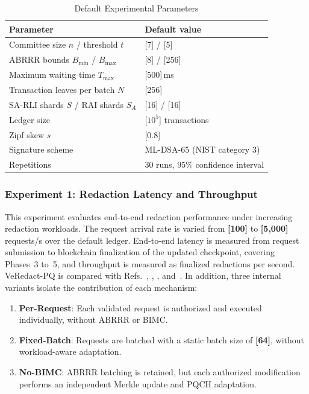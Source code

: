 \documentclass[lettersize,journal]{IEEEtran}
\begin{document}
    \begin{table}[t]
    \centering
    \caption{Default Experimental Parameters}
    \label{tab:params}
    \scriptsize
    \renewcommand{\arraystretch}{1.08}
    \setlength{\tabcolsep}{4pt}
    \begin{tabular}{ll}
    \hline
    \textbf{Parameter} & \textbf{Default value} \\
    \hline
    Committee size $n$ / threshold $t$ & [7] / [5] \\
    ABRRR bounds $B_{\min}$ / $B_{\max}$ & [8] / [256] \\
    Maximum waiting time $T_{\max}$ & [500]\,ms \\
    Transaction leaves per batch $N$ & [256] \\
    SA-RLI shards $S$ / RAI shards $S_A$ & [16] / [16] \\
    Ledger size & [$10^5$] transactions \\
    Zipf skew $s$ & [0.8] \\
    Signature scheme & ML-DSA-65 (NIST category 3) \\
    Repetitions & 30 runs, 95\% confidence interval \\
    \hline
    \end{tabular}
    \end{table}
    
    \subsubsection*{\textbf{Experiment 1: Redaction Latency and Throughput}}
    
    This experiment evaluates end-to-end redaction performance under
    increasing redaction workloads. The request arrival rate is varied from
    \textbf{[100]} to \textbf{[5,000]} requests/s over the default ledger.
    End-to-end latency is measured from request submission to blockchain
    finalization of the updated checkpoint, covering Phases~3 to~5, and
    throughput is measured as finalized redactions per second. VeRedact-PQ
    is compared with Refs.~\cite{ref1}, \cite{ref13}, \cite{ref27},
    and~\cite{ref34}. In addition, three internal variants isolate the
    contribution of each mechanism:
    
    \begin{enumerate}
    \item \textbf{Per-Request}: Each validated request is authorized and
    executed individually, without ABRRR or BIMC.
    \item \textbf{Fixed-Batch}: Requests are batched with a static batch
    size of \textbf{[64]}, without workload-aware adaptation.
    \item \textbf{No-BIMC}: ABRRR batching is retained, but each authorized
    modification performs an independent Merkle update and PQCH adaptation.
    \end{enumerate}
    
\end{document}
